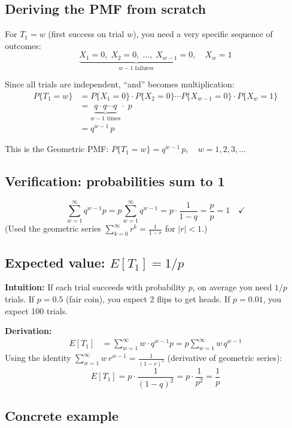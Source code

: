 \documentclass[12pt]{article}
\begin{document}
\subsection*{Deriving the PMF from scratch}

For $T_1 = w$ (first success on trial $w$), you need a very specific sequence of outcomes:
\[
    \underbrace{X_1 = 0, \; X_2 = 0, \; \ldots, \; X_{w-1} = 0}_{w-1 \text{ failures}}, \quad X_w = 1
\]

Since all trials are independent, ``and'' becomes multiplication:
\begin{align*}
    P\{T_1 = w\} &= P\{X_1 = 0\} \cdot P\{X_2 = 0\} \cdots P\{X_{w-1} = 0\} \cdot P\{X_w = 1\} \\
    &= \underbrace{q \cdot q \cdots q}_{w-1 \text{ times}} \cdot \; p \\[6pt]
    &= q^{w-1} \, p
\end{align*}

This is the Geometric PMF: $\boxed{P\{T_1 = w\} = q^{w-1}\, p, \quad w = 1, 2, 3, \ldots}$

\subsection*{Verification: probabilities sum to 1}

\[
    \sum_{w=1}^{\infty} q^{w-1} p = p \sum_{w=1}^{\infty} q^{w-1} = p \cdot \frac{1}{1-q} = \frac{p}{p} = 1 \quad \checkmark
\]
(Used the geometric series $\sum_{k=0}^{\infty} r^k = \frac{1}{1-r}$ for $|r| < 1$.)

\subsection*{Expected value: $E[T_1] = 1/p$}

\textbf{Intuition:} If each trial succeeds with probability $p$, on average you need $1/p$ trials. If $p = 0.5$ (fair coin), you expect 2 flips to get heads. If $p = 0.01$, you expect 100 trials.

\textbf{Derivation:}
\begin{align*}
    E[T_1] &= \sum_{w=1}^{\infty} w \cdot q^{w-1} p = p \sum_{w=1}^{\infty} w \, q^{w-1}
\end{align*}
Using the identity $\displaystyle\sum_{w=1}^{\infty} w\, r^{w-1} = \frac{1}{(1-r)^2}$ (derivative of geometric series):
\[
    E[T_1] = p \cdot \frac{1}{(1-q)^2} = p \cdot \frac{1}{p^2} = \frac{1}{p}
\]

\subsection*{Concrete example}
\end{document}
